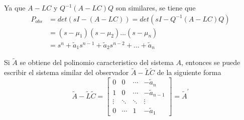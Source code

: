 Ya que \( A-LC \) y \(Q^{-1}(A-LC)Q\) son similares, se tiene que
\[
    \begin{split}
        P_{obs} & = det(sI-(A-LC)) = det(sI-Q^{-1}(A-LC)Q)\\
        & = (s-\mu_{1}) (s-\mu_{2}) \ldots (s-\mu_{n})\\
        & = s^{n} +\tilde{a}_{1}s^{n-1} + \tilde{a}_{2}s^{n-2} + \ldots + \tilde{a}_{n}
    \end{split}
\]

Si \( \tilde{A} \) se obtiene del polinomio caracteristico del sistema \( A \), entonces se puede escribir el sistema similar del observador \( \tilde{A}-\tilde{L}\tilde{C} \) de la siguiente forma
\[
    \tilde{A}-\tilde{L}\tilde{C}=
    \begin{bmatrix}
        0 & 0 & \cdots & -\tilde{a}_{n} \\
        1 & 0 & \cdots & -\tilde{a}_{n-1} \\
        \vdots & \ddots & \ddots & \vdots \\
        0 & \cdots & 1 & -\tilde{a}_{1}
    \end{bmatrix} = \tilde{A}^{'}
\]


